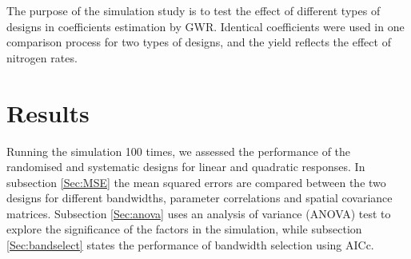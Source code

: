 \documentclass[a4paper]{article} 	%
\newcommand{\AR}{\mathrm{AR1}}
\begin{document}



The purpose of the simulation study is to test the effect of different types of designs in coefficients estimation by GWR. Identical coefficients were used in one comparison process for two types of designs, and the yield reflects the effect of nitrogen rates.  


\section{Results}\label{Sec:Res}

Running the simulation 100 times, we assessed the performance of the randomised and systematic designs for linear and quadratic responses. In subsection \ref{Sec:MSE} the mean squared errors are compared between the two designs for different bandwidths, parameter correlations and spatial covariance matrices. Subsection \ref{Sec:anova} uses an analysis of variance (ANOVA) test to explore the significance of the factors in the simulation, while subsection \ref{Sec:bandselect} states the performance of bandwidth selection using AICc. 
\end{document}
